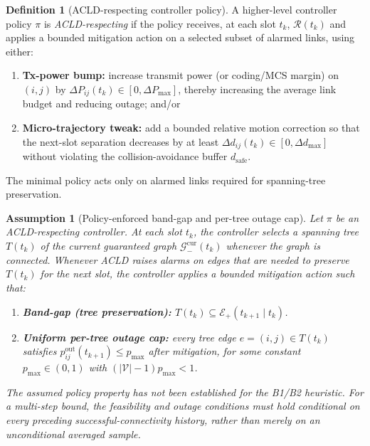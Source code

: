 \documentclass[preprint,12pt]{elsarticle}
\theoremstyle{definition}\newtheorem{definition}{Definition}
\theoremstyle{plain}\newtheorem{theorem}{Theorem}
\theoremstyle{plain}\newtheorem{lemma}{Lemma}
\theoremstyle{plain}\newtheorem{corollary}{Corollary}
\theoremstyle{plain}\newtheorem{assumption}{Assumption}
\theoremstyle{remark}\newtheorem{remark}[theorem]{Remark}
\begin{document}
\begin{definition}[ACLD-respecting controller policy]
\label{def:acld_policy}
A higher-level controller policy $\pi$ is \emph{ACLD-respecting} if the policy receives, at each slot $t_k$,
$\mathcal R(t_k)$ and applies a bounded mitigation action on a selected subset of alarmed links,
using either:
\begin{enumerate}[label=(\alph*),leftmargin=1.0cm]
\item \textbf{Tx-power bump:} increase transmit power (or coding/MCS margin) on $(i,j)$ by $\Delta P_{ij}(t_k)\in[0,\Delta P_{\max}]$,
thereby increasing the average link budget and reducing outage; and/or
\item \textbf{Micro-trajectory tweak:} add a bounded relative motion correction so that the next-slot separation decreases by at least
$\Delta d_{ij}(t_k)\in[0,\Delta d_{\max}]$ without violating the collision-avoidance buffer $d_{\mathrm{safe}}$.
\end{enumerate}
The minimal policy acts only on alarmed links required for spanning-tree preservation.
\end{definition}

\begin{assumption}[Policy-enforced band-gap and per-tree outage cap]
\label{asm:policy_bandgap}
Let $\pi$ be an ACLD-respecting controller. At each slot $t_k$, the controller selects a spanning tree $T(t_k)$ of the \emph{current guaranteed} graph $\mathcal G_-^{\mathrm{cur}}(t_k)$ whenever the graph is connected. Whenever ACLD raises alarms on edges that are needed to preserve $T(t_k)$ for the next slot, the controller applies a bounded mitigation action such that:

\begin{enumerate}[label=(\roman*),leftmargin=1.0cm]
\item \textbf{Band-gap (tree preservation):} $T(t_k)\subseteq \mathcal E_+(t_{k+1}\mid t_k)$.
\item \textbf{Uniform per-tree outage cap:} every tree edge $e=(i,j)\in T(t_k)$ satisfies
$p^{\mathrm{out}}_{ij}(t_{k+1})\le p_{\max}$ after mitigation, for some constant $p_{\max}\in(0,1)$ with $(|\mathcal{V}|-1)p_{\max}<1$.
\end{enumerate}

The assumed policy property has not been established for the B1/B2 heuristic. For a multi-step bound, the feasibility and outage conditions must hold conditional on every preceding successful-connectivity history, rather than merely on an unconditional averaged sample.
\end{assumption}
\end{document}
